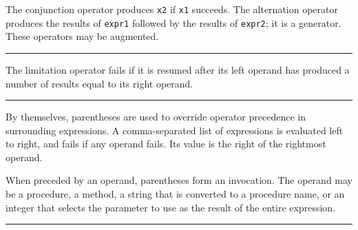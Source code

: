 \noindent
The conjunction operator produces \texttt{x2} if
\texttt{x1} succeeds. The alternation operator produces the results of \texttt{expr1} followed
by the results of \texttt{expr2}; it is a generator.
These operators may be augmented.

\bigskip\hrule\vspace{0.1cm}

\noindent
The limitation operator fails if it
is resumed after its left operand has produced a number of results
equal to its right operand.

\bigskip\hrule\vspace{0.1cm}


\noindent
By themselves, parentheses are used
to override operator precedence in surrounding expressions. A
comma-separated list of expressions is evaluated left to right, and
fails if any operand fails. Its value is the right of the rightmost
operand.

When preceded by an operand, parentheses form an
invocation. The operand may be a procedure,
a method, a string that is converted to a procedure name, or an integer
that selects the parameter to use as the result of the entire expression.

\bigskip\hrule\vspace{0.1cm}







